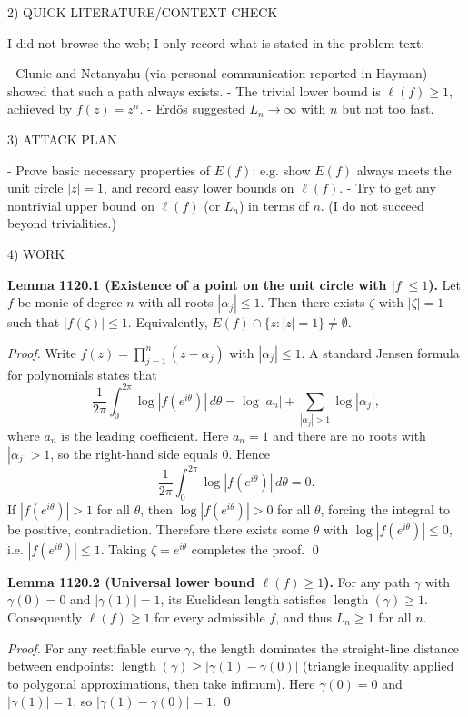 2) QUICK LITERATURE/CONTEXT CHECK

I did not browse the web; I only record what is stated in the problem text:

- Clunie and Netanyahu (via personal communication reported in Hayman) showed that such a path always exists.
- The trivial lower bound is \(\ell(f)\ge 1\), achieved by \(f(z)=z^n\).
- Erd\H{o}s suggested \(L_n\to\infty\) with \(n\) but not too fast.

3) ATTACK PLAN

- Prove basic necessary properties of \(E(f)\): e.g. show \(E(f)\) always meets the unit circle \(|z|=1\), and record easy lower bounds on \(\ell(f)\).
- Try to get any nontrivial upper bound on \(\ell(f)\) (or \(L_n\)) in terms of \(n\). (I do not succeed beyond trivialities.)

4) WORK

\textbf{Lemma 1120.1 (Existence of a point on the unit circle with \(|f|\le 1\)).}
Let \(f\) be monic of degree \(n\) with all roots \(|\alpha_j|\le 1\). Then there exists \(\zeta\) with \(|\zeta|=1\) such that \(|f(\zeta)|\le 1\). Equivalently, \(E(f)\cap\{z:|z|=1\}\ne\emptyset\).

\emph{Proof.}
Write \(f(z)=\prod_{j=1}^n (z-\alpha_j)\) with \(|\alpha_j|\le 1\).
A standard Jensen formula for polynomials states that
\[
\frac{1}{2\pi}\int_0^{2\pi} \log|f(e^{i\theta})|\,d\theta
= \log|a_n| + \sum_{|\alpha_j|>1} \log|\alpha_j|,
\]
where \(a_n\) is the leading coefficient. Here \(a_n=1\) and there are no roots with \(|\alpha_j|>1\), so the right-hand side equals \(0\). Hence
\[
\frac{1}{2\pi}\int_0^{2\pi} \log|f(e^{i\theta})|\,d\theta = 0.
\]
If \(|f(e^{i\theta})|>1\) for all \(\theta\), then \(\log|f(e^{i\theta})|>0\) for all \(\theta\), forcing the integral to be positive, contradiction. Therefore there exists some \(\theta\) with \(\log|f(e^{i\theta})|\le 0\), i.e. \(|f(e^{i\theta})|\le 1\). Taking \(\zeta=e^{i\theta}\) completes the proof. \qed

\textbf{Lemma 1120.2 (Universal lower bound \(\ell(f)\ge 1\)).}
For any path \(\gamma\) with \(\gamma(0)=0\) and \(|\gamma(1)|=1\), its Euclidean length satisfies \(\operatorname{length}(\gamma)\ge 1\). Consequently \(\ell(f)\ge 1\) for every admissible \(f\), and thus \(L_n\ge 1\) for all \(n\).

\emph{Proof.}
For any rectifiable curve \(\gamma\), the length dominates the straight-line distance between endpoints:
\(\operatorname{length}(\gamma)\ge |\gamma(1)-\gamma(0)|\) (triangle inequality applied to polygonal approximations, then take infimum).
Here \(\gamma(0)=0\) and \(|\gamma(1)|=1\), so \(|\gamma(1)-\gamma(0)|=1\). \qed

